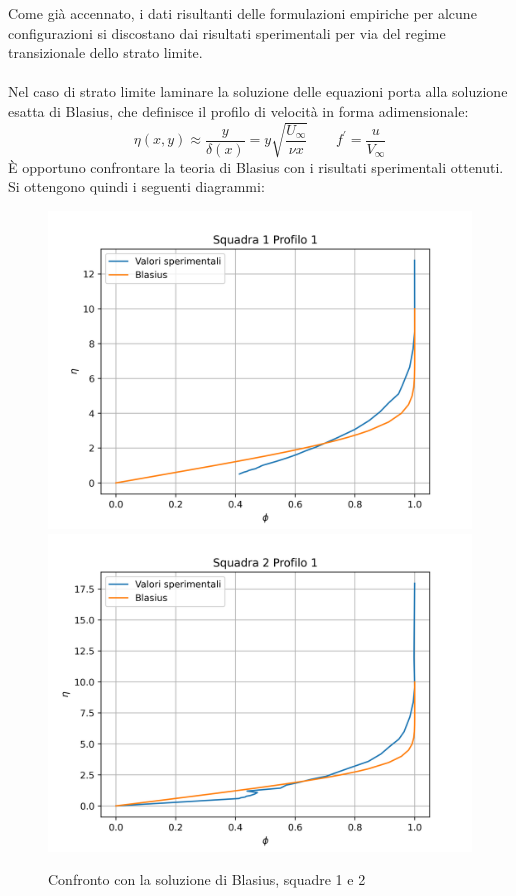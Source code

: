\noindent Come già accennato, i dati risultanti delle formulazioni empiriche per alcune configurazioni si discostano dai risultati sperimentali per via del regime transizionale dello strato limite.\\\\
Nel caso di strato limite laminare la soluzione delle equazioni porta alla soluzione esatta di Blasius, che definisce il profilo di velocità in forma adimensionale:
\begin{equation*}
    \eta(x,y) \approx \frac{y}{\delta(x)} = y\sqrt{\frac{U_\infty}{\nu x}} \qquad f^\prime = \frac{u}{V_\infty}
\end{equation*}
È opportuno confrontare la teoria di Blasius con i risultati sperimentali ottenuti. Si ottengono quindi i seguenti diagrammi:
\begin{figure}[H]
    \centering
    \includegraphics[width=.49\textwidth]{images/9/sq1p1_blasius.png}
    \includegraphics[width=.49\textwidth]{images/9/sq2p1_blasius.png}
    \caption{Confronto con la soluzione di Blasius, squadre 1 e 2}
\end{figure}

